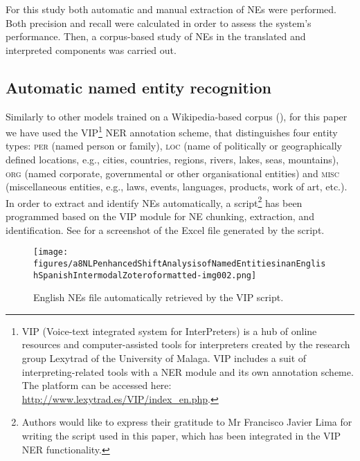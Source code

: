 \documentclass[output=paper]{langscibook}
\begin{document}
For this study both automatic and manual extraction of NEs were performed. Both precision and recall were calculated in order to assess the system’s performance. Then, a corpus-based study of NEs in the translated and interpreted components was carried out.


\subsection{Automatic named entity recognition}\label{sec:corpas:4.1}

Similarly to other models trained on a Wikipedia-based corpus (\cite{NothmanEtAl2013}), for this paper we have used the VIP\footnote{VIP (Voice-text integrated system for InterPreters) is a hub of online resources and computer-assisted tools for interpreters created by the research group Lexytrad of the University of Malaga. VIP includes a suit of interpreting-related tools with a NER module and its own annotation scheme. The platform can be accessed here: \url{http://www.lexytrad.es/VIP/index_en.php}.} NER annotation scheme, that distinguishes four entity types: \textsc{per} (named person or family), \textsc{loc} (name of politically or geographically defined locations, e.g., cities, countries, regions, rivers, lakes, seas, mountains), \textsc{org} (named corporate, governmental or other organisational entities) and \textsc{misc} (miscellaneous entities, e.g., laws, events, languages, products, work of art, etc.). In order to extract and identify NEs automatically, a script\footnote{Authors would like to express their gratitude to Mr Francisco Javier Lima for writing the script used in this paper, which has been integrated in the VIP NER functionality.}  has been programmed based on the VIP module for NE chunking, extraction, and identification. See  for a screenshot of the Excel file generated by the script.

\begin{figure}
\texttt{[image: figures/a8NLPenhancedShiftAnalysisofNamedEntitiesinanEnglishSpanishIntermodalZoteroformatted-img002.png]}
 

\caption{
English NEs file automatically retrieved by the VIP script.
}
\label{fig:corpas:2}
\end{figure}
\end{document}
